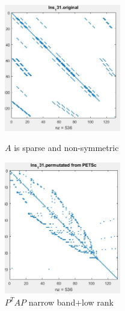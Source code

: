 \documentclass[a4paper,12pt]{article}
\begin{document}
\begin{figure}[ht]
\centering
\begin{minipage}[b]{0.45\linewidth}
\includegraphics[width=2in]{Images/SparseA_v4.jpg}
\caption{$A$ is sparse and non-symmetric}
\label{sparseA}
\end{minipage}
\quad
\begin{minipage}[b]{0.45\linewidth}
\includegraphics[width=2in]{Images/ApproxBanded_v2.jpg}
\caption{$P^TAP$ narrow band+low rank}
\label{fig:approxbanded}
\end{minipage}
\end{figure}


\end{document}
